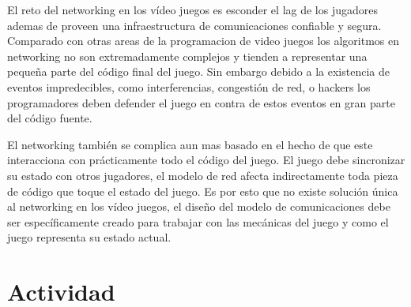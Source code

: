 El reto del networking en los vídeo juegos es esconder el lag de los jugadores ademas de proveen una infraestructura de comunicaciones confiable y segura. Comparado con otras areas de la programacion de video juegos los algoritmos en networking no son extremadamente complejos y tienden a representar una pequeña parte del código final del juego. Sin embargo debido a la existencia de eventos impredecibles, como interferencias, congestión de red, o hackers los programadores deben defender el juego en contra de estos eventos en gran parte del código fuente.

El networking también se complica aun mas basado en el hecho de que este interacciona con prácticamente todo el código del juego. El juego debe sincronizar su estado con otros jugadores, el modelo de red afecta indirectamente toda pieza de código que toque el estado del juego. Es por esto que no existe solución única al networking en los vídeo juegos, el diseño del modelo de comunicaciones debe ser específicamente creado para trabajar con las mecánicas del juego y como el juego representa su estado actual.
\section{Actividad}
